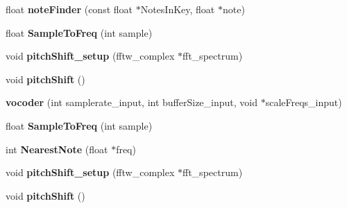 \begin{DoxyCompactItemize}
\item 
\hypertarget{classvocoder_afb731a113935c575939ebdff7ae37580}{float {\bfseries note\-Finder} (const float $\ast$Notes\-In\-Key, float $\ast$note)}\label{classvocoder_afb731a113935c575939ebdff7ae37580}

\item 
\hypertarget{classvocoder_a2b3a6e386d3a18f9366320e5743d33b1}{float {\bfseries Sample\-To\-Freq} (int sample)}\label{classvocoder_a2b3a6e386d3a18f9366320e5743d33b1}

\item 
\hypertarget{classvocoder_aa3d122aee6d6ae77ac5b04572e924dc0}{void {\bfseries pitch\-Shift\-\_\-setup} (fftw\-\_\-complex $\ast$fft\-\_\-spectrum)}\label{classvocoder_aa3d122aee6d6ae77ac5b04572e924dc0}

\item 
\hypertarget{classvocoder_aa218678a51da7429066c32e59edd5057}{void {\bfseries pitch\-Shift} ()}\label{classvocoder_aa218678a51da7429066c32e59edd5057}

\item 
\hypertarget{classvocoder_a759189527108a2f32b992406b8210db8}{{\bfseries vocoder} (int samplerate\-\_\-input, int buffer\-Size\-\_\-input, void $\ast$scale\-Freqs\-\_\-input)}\label{classvocoder_a759189527108a2f32b992406b8210db8}

\item 
\hypertarget{classvocoder_a2b3a6e386d3a18f9366320e5743d33b1}{float {\bfseries Sample\-To\-Freq} (int sample)}\label{classvocoder_a2b3a6e386d3a18f9366320e5743d33b1}

\item 
\hypertarget{classvocoder_a8b1e51e28458338abc0eeaac00c1842f}{int {\bfseries Nearest\-Note} (float $\ast$freq)}\label{classvocoder_a8b1e51e28458338abc0eeaac00c1842f}

\item 
\hypertarget{classvocoder_aa3d122aee6d6ae77ac5b04572e924dc0}{void {\bfseries pitch\-Shift\-\_\-setup} (fftw\-\_\-complex $\ast$fft\-\_\-spectrum)}\label{classvocoder_aa3d122aee6d6ae77ac5b04572e924dc0}

\item 
\hypertarget{classvocoder_aa218678a51da7429066c32e59edd5057}{void {\bfseries pitch\-Shift} ()}\label{classvocoder_aa218678a51da7429066c32e59edd5057}

\end{DoxyCompactItemize}
